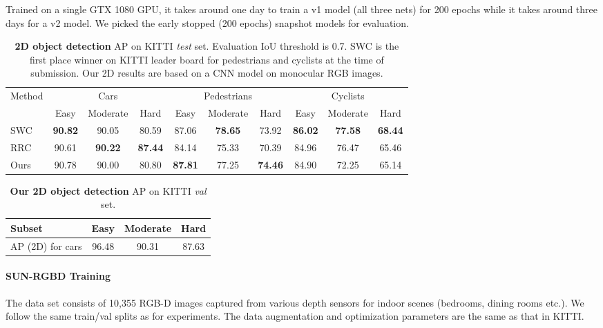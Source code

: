 \documentclass[10pt,twocolumn,letterpaper]{article}
\begin{document}
Trained on a single GTX 1080 GPU, it takes around one day to train a v1 model (all three nets) for 200 epochs while it takes around three days for a v2 model. We picked the early stopped (200 epochs) snapshot models for evaluation.

\begin{table*}[t!]
\small
\centering
\begin{tabular}{l|ccc||ccc||ccc}
\hline
\multirow{2}{*}{Method} & \multicolumn{3}{c||}{Cars} & \multicolumn{3}{c||}{Pedestrians} & \multicolumn{3}{c}{Cyclists} \\ \cline{2-10} 
                        & Easy  & Moderate  & Hard  & Easy     & Moderate    & Hard    & Easy    & Moderate   & Hard   \\ \hline
SWC & \textbf{90.82} & 90.05 & 80.59 & 87.06 & \textbf{78.65} & 73.92 & \textbf{86.02} & \textbf{77.58} & \textbf{68.44} \\
RRC~\cite{Ren17CVPR} & 90.61 & \textbf{90.22} & \textbf{87.44} & 84.14 & 75.33 & 70.39 & 84.96 & 76.47 & 65.46 \\
Ours & 90.78 & 90.00 & 80.80 & \textbf{87.81} & 77.25 & \textbf{74.46} & 84.90 & 72.25 & 65.14 \\ \hline
\end{tabular}
\caption{\textbf{2D object detection} AP on KITTI \emph{test} set. Evaluation IoU threshold is 0.7. SWC is the first place winner on KITTI leader board for pedestrians and cyclists at the time of submission. Our 2D results are based on a CNN model on monocular RGB images.}
\label{tab:kitti_test_2d}
\end{table*}

\begin{table}[t!]
\centering
\begin{tabular}{l|ccc}
\hline
Subset & Easy    & Moderate    & Hard   \\ \hline
AP (2D) for cars   & 96.48 & 90.31 & 87.63 \\ \hline
\end{tabular}
\caption{\textbf{Our 2D object detection} AP on KITTI \emph{val} set.}
\label{tab:kitti_val_2d_detection}
\end{table}


\paragraph{SUN-RGBD Training} The data set consists of 10,355 RGB-D images captured from various depth sensors for indoor scenes (bedrooms, dining rooms etc.). We follow the same train/val splits as \cite{song2015sun,ren2016three} for experiments. The data augmentation and optimization parameters are the same as that in KITTI.
\end{document}
